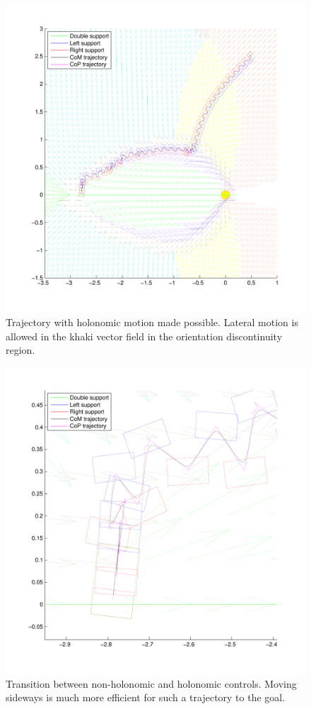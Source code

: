 \begin{figure}[ht]
\centering
\includegraphics[scale=0.8  ]{Chap5-Visual-Planning/steps11.pdf}
\caption{Trajectory with holonomic motion made possible. Lateral motion is allowed in the khaki vector field in the orientation discontinuity region.}
\label{fig:steps11}
\end{figure}

\begin{figure}[ht]
\centering
\includegraphics[scale=0.55]{Chap5-Visual-Planning/steps11zoom.pdf}
\caption{Transition between non-holonomic and holonomic controls. Moving sideways is much more efficient for such a trajectory to the goal.}
\label{fig:steps11zoom}
\end{figure}

